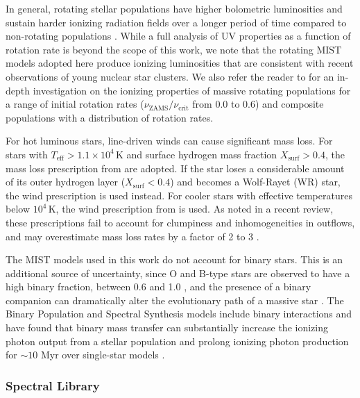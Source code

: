 \documentclass[preprint2,trackchanges]{aastex62}
\newcommand{\Myr}{$\,$Myr\xspace}
\begin{document}
In general, rotating stellar populations have higher bolometric luminosities and sustain harder ionizing radiation fields over a longer period of time compared to non-rotating populations \citep[e.g.,][]{Levesque+2012, Choi+2017}. While a full analysis of UV properties as a function of rotation rate is beyond the scope of this work, we note that the rotating MIST models adopted here produce ionizing luminosities that are consistent with recent observations of young nuclear star clusters. We also refer the reader to \citet{Choi+2017} for an in-depth investigation on the ionizing properties of massive rotating populations for a range of initial rotation rates ($\nu_{\mathrm{ZAMS}}/\nu_{\mathrm{crit}}$ from 0.0 to 0.6) and composite populations with a distribution of rotation rates.

For hot luminous stars, line-driven winds can cause significant mass loss. For stars with $T_{\mathrm{eff}}>1.1\times10^4\,$K and surface hydrogen mass fraction $X_{\mathrm{surf}}>0.4$, the mass loss prescription from \citet{Vink+2000, Vink+2001} are adopted. If the star loses a considerable amount of its outer hydrogen layer ($X_{\mathrm{surf}}<0.4$) and becomes a Wolf-Rayet (WR) star, the \citet{Nugis+2000} wind prescription is used instead. For cooler stars with effective temperatures below $10^4\,$K, the wind prescription from \citet{deJager+1988} is used. As noted in a recent review, these prescriptions fail to account for clumpiness and inhomogeneities in outflows, and may overestimate mass loss rates by a factor of 2 to 3 \citep{Smith+2014}.

The MIST models used in this work do not account for binary stars. This is an additional source of uncertainty, since O and B-type stars are observed to have a high binary fraction, between 0.6 and 1.0 \citep{Sana+2012, Kobulnicky+2014}, and the presence of a binary companion can dramatically alter the evolutionary path of a massive star \citep[e.g.,][]{deMink+2013, Smith+2014}. The Binary Population and Spectral Synthesis models \citep[BPASS;][]{Eldridge+2009, Eldridge+2017} include binary interactions and have found that binary mass transfer can substantially increase the ionizing photon output from a stellar population and prolong ionizing photon production for $\sim10$\,\Myr over single-star models \citep{Ma+2016, Xiao+2018}.

\subsubsection{Spectral Library}
\end{document}
